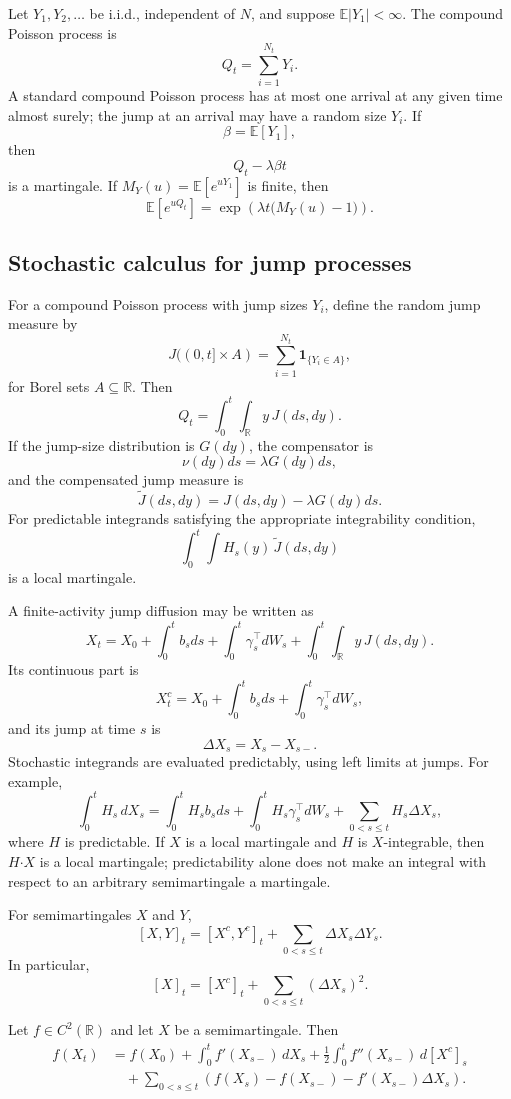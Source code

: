 Let $Y_1,Y_2,\ldots$ be i.i.d., independent of $N$, and suppose $\mathbb{E}|Y_1|<\infty$. The compound Poisson process is
\[
Q_t=\sum_{i=1}^{N_t}Y_i.
\]
A standard compound Poisson process has at most one arrival at any given time almost surely; the jump at an arrival may have a random size $Y_i$. If
\[
\beta=\mathbb{E}[Y_1],
\]
then
\[
Q_t-\lambda\beta t
\]
is a martingale. If $M_Y(u)=\mathbb{E}[e^{uY_1}]$ is finite, then
\[
\mathbb{E}[e^{uQ_t}]
=\exp\!\left(\lambda t\bigl(M_Y(u)-1\bigr)\right).
\]

\subsection{Stochastic calculus for jump processes}

For a compound Poisson process with jump sizes $Y_i$, define the random jump measure by
\[
J((0,t]\times A)
=\sum_{i=1}^{N_t}\mathbf{1}_{\{Y_i\in A\}},
\]
for Borel sets $A\subseteq\mathbb{R}$. Then
\[
Q_t=\int_0^t\int_{\mathbb{R}}y\,J(ds,dy).
\]
If the jump-size distribution is $G(dy)$, the compensator is
\[
\nu(dy)ds=\lambda G(dy)ds,
\]
and the compensated jump measure is
\[
\widetilde J(ds,dy)=J(ds,dy)-\lambda G(dy)ds.
\]
For predictable integrands satisfying the appropriate integrability condition,
\[
\int_0^t\int H_s(y)\,\widetilde J(ds,dy)
\]
is a local martingale.

A finite-activity jump diffusion may be written as
\[
X_t
=X_0+\int_0^tb_sds+\int_0^t\gamma_s^\top dW_s
 +\int_0^t\int_{\mathbb{R}}y\,J(ds,dy).
\]
Its continuous part is
\[
X_t^c
=X_0+\int_0^tb_sds+\int_0^t\gamma_s^\top dW_s,
\]
and its jump at time $s$ is
\[
\Delta X_s=X_s-X_{s-}.
\]
Stochastic integrands are evaluated predictably, using left limits at jumps. For example,
\[
\int_0^tH_s\,dX_s
=\int_0^tH_s b_sds
 +\int_0^tH_s\gamma_s^\top dW_s
 +\sum_{0<s\leq t}H_s\Delta X_s,
\]
where $H$ is predictable. If $X$ is a local martingale and $H$ is $X$-integrable, then $H\mathbin{\boldsymbol\cdot}X$ is a local martingale; predictability alone does not make an integral with respect to an arbitrary semimartingale a martingale.

For semimartingales $X$ and $Y$,
\[
[X,Y]_t
=[X^c,Y^c]_t
 +\sum_{0<s\leq t}\Delta X_s\Delta Y_s.
\]
In particular,
\[
[X]_t=[X^c]_t+\sum_{0<s\leq t}(\Delta X_s)^2.
\]

\begin{thm}
Let $f\in C^2(\mathbb{R})$ and let $X$ be a semimartingale. Then
\[
\begin{aligned}
f(X_t)
&=f(X_0)
 +\int_0^tf'(X_{s-})\,dX_s
 +\frac12\int_0^tf''(X_{s-})\,d[X^c]_s\\
&\quad+\sum_{0<s\leq t}
 \left(
 f(X_s)-f(X_{s-})-f'(X_{s-})\Delta X_s
 \right).
\end{aligned}
\]
\end{thm}


